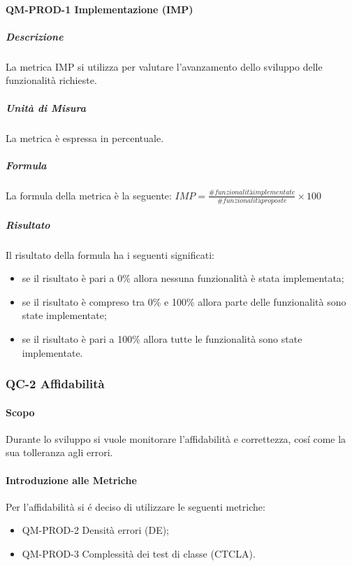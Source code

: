 		\paragraph{QM-PROD-1 Implementazione (IMP)}
			\subparagraph{Descrizione}
				La metrica IMP si utilizza per valutare l'avanzamento dello sviluppo delle funzionalità richieste.
			\subparagraph{Unità di Misura}
				La metrica è espressa in percentuale.
			\subparagraph{Formula}
				La formula della metrica è la seguente:
				\(
					IMP = \frac{\# funzionalità implementate}{\# funzionalità proposte}\times100
				\)
			\subparagraph{Risultato}
				Il risultato della formula ha i seguenti significati:
				\begin{itemize}
					\item se il risultato è pari a 0\% allora nessuna funzionalità è stata implementata;
					\item se il risultato è compreso tra 0\% e 100\% allora parte delle funzionalità sono state implementate;
					\item se il risultato è pari a 100\% allora tutte le funzionalità sono state implementate.
				\end{itemize}

	\subsubsection{QC-2 Affidabilità}
		\paragraph{Scopo}
		Durante lo sviluppo si vuole monitorare l'affidabilità e correttezza, cosí come la sua tolleranza agli errori.
		\paragraph{Introduzione alle Metriche}
			Per l'affidabilità si é deciso di utilizzare le seguenti metriche:
			\begin{itemize}
				\item QM-PROD-2 Densità errori (DE);
				\item QM-PROD-3 Complessità dei test di classe (CTCLA).
			\end{itemize}
